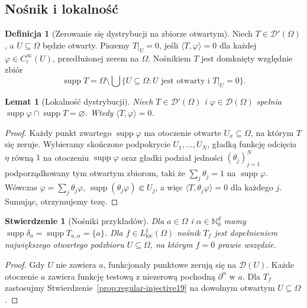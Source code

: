 \documentclass[11pt,a4paper]{article}
\numberwithin{equation}{section}
\theoremstyle{plain}
\newtheorem{stwierdzenie}[twierdzenie]{Stwierdzenie}
\newtheorem{lemat}[twierdzenie]{Lemat}
\theoremstyle{definition}
\newtheorem{definicja}[twierdzenie]{Definicja}
\theoremstyle{remark}
\newcommand{\N}{\mathbb N}
\DeclareMathOperator{\supp}{supp}
\begin{document}
\subsection{Nośnik i lokalność}

\begin{definicja}[Zerowanie się dystrybucji na zbiorze otwartym]
\label{def:distribution-zero19}
Niech $T\in\mathcal D'(\Omega)$, a $U\subseteq\Omega$
będzie otwarty. Piszemy $T|_U=0$, jeśli
$\langle T,\varphi\rangle=0$ dla każdej
$\varphi\in C_c^\infty(U)$, przedłużonej zerem na $\Omega$.
Nośnikiem $T$ jest domknięty względnie zbiór
\[\supp T=\Omega\setminus\bigcup\{U\subseteq\Omega:
U\text{ jest otwarty i }T|_U=0\}.\]
\end{definicja}

\begin{lemat}[Lokalność dystrybucji]
\label{lem:distribution-local19}
Niech $T\in\mathcal D'(\Omega)$ i
$\varphi\in\mathcal D(\Omega)$ spełnia
$\supp\varphi\cap\supp T=\varnothing$. Wtedy
$\langle T,\varphi\rangle=0$.
\end{lemat}
\begin{proof}
Każdy punkt zwartego $\supp\varphi$ ma otoczenie otwarte
$U_x\subseteq\Omega$, na którym $T$ się zeruje.
Wybieramy skończone podpokrycie
$U_1,\ldots,U_N$, gładką funkcję odcięcia $\eta$ równą
$1$ na otoczeniu $\supp\varphi$ oraz gładki podział
jedności $(\theta_j)_{j=1}^N$ podporządkowany tym
otwartym zbiorom, taki że
$\sum_j\theta_j=1$ na $\supp\varphi$.
Wówczas $\varphi=\sum_j\theta_j\varphi$,
$\supp(\theta_j\varphi)\Subset U_j$, a więc
$\langle T,\theta_j\varphi\rangle=0$ dla każdego $j$.
Sumując, otrzymujemy tezę.
\end{proof}

\begin{stwierdzenie}[Nośniki przykładów]
\label{prop:support-examples19}
Dla $a\in\Omega$ i $\alpha\in\N_0^d$ mamy
$\supp\delta_a=\supp T_{a,\alpha}=\{a\}$.
Dla $f\in L^1_{\mathrm{loc}}(\Omega)$ nośnik $T_f$
jest dopełnieniem największego otwartego podzbioru
$U\subseteq\Omega$, na którym $f=0$ prawie wszędzie.
\end{stwierdzenie}
\begin{proof}
Gdy $U$ nie zawiera $a$, funkcjonały punktowe zerują się
na $\mathcal D(U)$. Każde otoczenie $a$ zawiera funkcję
testową z niezerową pochodną $\partial^\alpha$ w $a$.
Dla $T_f$ zastosujmy Stwierdzenie~\ref{prop:regular-injective19}
na dowolnym otwartym $U\subseteq\Omega$.
\end{proof}
\end{document}
